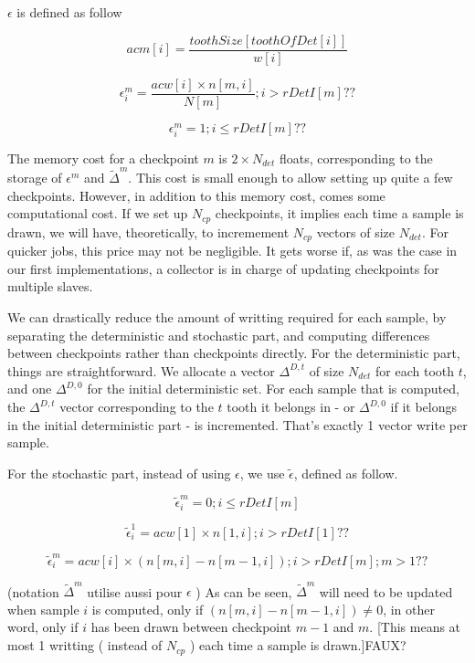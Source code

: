 \documentclass[./thesis.tex]{subfiles}
\begin{document}
$\epsilon$ is defined as follow

$$acm[i] = \frac{toothSize[toothOfDet[i]]}{w[i]}$$


$$\epsilon^m_i = \frac{acw[i] \times n[m,i]}{N[m]}  ; i>rDetI[m] ??$$

$$\epsilon^m_i = 1 ; i \leq rDetI[m] ??$$

The memory cost for a checkpoint $m$ is $2 \times N_{det}$ floats, corresponding to the storage of $\epsilon^m$ and $\tilde \Delta^m$. This cost is small enough to allow setting up quite a few checkpoints. However, in addition to this memory cost, comes some computational cost. If we set up $N_{cp}$ checkpoints, it implies each time a sample is drawn, we will have, theoretically, to incremement $N_{cp}$ vectors of size $N_{det}$. For quicker jobs, this price may not be negligible. It gets worse if, as was the case in our first implementations, a collector is in charge of updating checkpoints for multiple slaves. 


We can drastically reduce the amount of writting required for each sample, by separating the deterministic and stochastic part, and computing differences between checkpoints rather than checkpoints directly.
For the deterministic part, things are straightforward. We allocate a vector $\Delta^{D,t}$ of size $N_{det}$ for each tooth $t$, and one $\Delta^{D,0}$ for the initial deterministic set. For each sample that is computed, the $\Delta^{D,t}$ vector corresponding to the $t$ tooth it belongs in - or $\Delta^{D,0}$ if it belongs in the initial deterministic part - is incremented. That's exactly 1 vector write per sample.

For the stochastic part, instead of using $\epsilon$, we use $\tilde \epsilon$, defined as follow.

$$\tilde \epsilon^m_i = 0 ; i \leq rDetI[m]$$

$$\tilde \epsilon^1_i = acw[1] \times n[1,i]  ; i>rDetI[1] ??$$

$$\tilde \epsilon^m_i = acw[i] \times (n[m,i]-n[m-1,i])  ; i>rDetI[m]; m>1 ??$$

(notation  $\tilde \Delta^m$ utilise aussi pour $\epsilon$ )
As can be seen, $\tilde \Delta^m$ will need to be updated when sample $i$ is computed, only if $(n[m,i]-n[m-1,i]) \neq 0$, in other word, only if $i$ has been drawn between checkpoint $m-1$ and $m$. [This means at most 1 writting ( instead of $N_{cp}$ ) each time a sample is drawn.]FAUX? 
\end{document}

